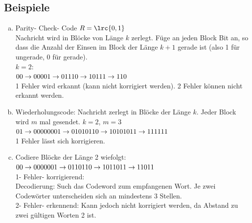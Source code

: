   \subsection{Beispiele}
    \begin{enumerate}[a)]
      \item Parity- Check- Code
        $R=\lrc{0,1}$\\
        Nachricht wird in Blöcke von Länge $k$ zerlegt. Füge an jeden Block Bit
        an, so dass die Anzahl der Einsen im Block der Länge $k+1$ gerade ist
        (also 1 für ungerade, 0 für gerade).\\
        $k=2$:\\
        $00\rightarrow000\\
        01\rightarrow011\\
        10\rightarrow101\\
        11\rightarrow110$\\
        1 Fehler wird erkannt (kann nicht korrigiert werden). 2 Fehler können
        nicht erkannt werden.
      \item Wiederholungscode: Nachricht zerlegt in Blöcke der Länge $k$. Jeder
        Block wird $m$ mal gesendet. $k=2$, $m=3$\\
        $01\rightarrow000000\\
        01\rightarrow010101\\
        10\rightarrow101010\\
        11\rightarrow111111$\\
        1 Fehler lässt sich korrigieren.
      \item Codiere Blöcke der Länge 2 wiefolgt:\\
        $00\rightarrow00000\\
        01\rightarrow01101\\
        10\rightarrow10110\\
        11\rightarrow11011$\\
        1- Fehler- korrigierend:\\
        Decodierung: Such das  Codeword zum empfangenen Wort. Je
        zwei Codewörter unterscheiden sich an mindestens 3 Stellen.\\
        2- Fehler- erkennend: Kann jedoch nicht korrigiert werden, da Abstand
        zu zwei gültigen Worten 2 ist.
    \end{enumerate}
